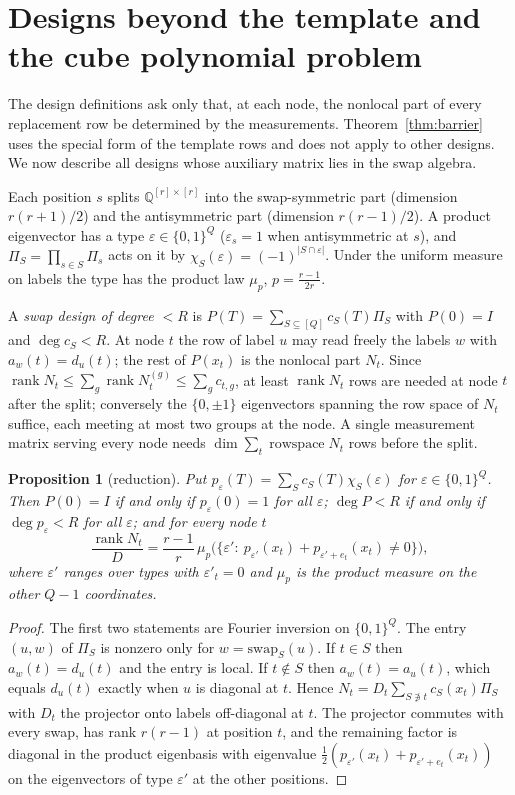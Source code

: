 \documentclass[11pt]{article}
\newtheorem{proposition}[theorem]{Proposition}
\theoremstyle{definition}
\theoremstyle{remark}
\newcommand{\Q}{\mathbb{Q}}
\newcommand{\rank}{\operatorname{rank}}
\begin{document}
\section{Designs beyond the template and the cube polynomial problem}\label{sec:cp}

The design definitions ask only that, at each node, the nonlocal part of every replacement row be determined by the measurements. Theorem~\ref{thm:barrier} uses the special form of the template rows and does not apply to other designs. We now describe all designs whose auxiliary matrix lies in the swap algebra.

Each position $s$ splits $\Q^{[r]\times[r]}$ into the swap-symmetric part (dimension $r(r+1)/2$) and the antisymmetric part (dimension $r(r-1)/2$). A product eigenvector has a type $\varepsilon\in\{0,1\}^Q$ ($\varepsilon_s=1$ when antisymmetric at $s$), and $\Pi_S=\prod_{s\in S}\Pi_s$ acts on it by $\chi_S(\varepsilon)=(-1)^{|S\cap\varepsilon|}$. Under the uniform measure on labels the type has the product law $\mu_p$, $p=\frac{r-1}{2r}$.

A \emph{swap design of degree $<R$} is $P(T)=\sum_{S\subseteq[Q]}c_S(T)\Pi_S$ with $P(0)=I$ and $\deg c_S<R$. At node $t$ the row of label $u$ may read freely the labels $w$ with $a_w(t)=d_u(t)$; the rest of $P(x_t)$ is the nonlocal part $N_t$. Since $\rank N_t\le\sum_g\rank N_t^{(g)}\le\sum_gc_{t,g}$, at least $\rank N_t$ rows are needed at node $t$ after the split; conversely the $\{0,\pm1\}$ eigenvectors spanning the row space of $N_t$ suffice, each meeting at most two groups at the node. A single measurement matrix serving every node needs $\dim\sum_t\operatorname{rowspace}N_t$ rows before the split.

\begin{proposition}[reduction]\label{prop:reduction}
Put $p_\varepsilon(T)=\sum_Sc_S(T)\chi_S(\varepsilon)$ for $\varepsilon\in\{0,1\}^Q$. Then $P(0)=I$ if and only if $p_\varepsilon(0)=1$ for all $\varepsilon$; $\deg P<R$ if and only if $\deg p_\varepsilon<R$ for all $\varepsilon$; and for every node $t$
\[
\frac{\rank N_t}{D}=\frac{r-1}{r}\,\mu_p\big(\{\varepsilon':\ p_{\varepsilon'}(x_t)+p_{\varepsilon'+e_t}(x_t)\ne0\}\big),
\]
where $\varepsilon'$ ranges over types with $\varepsilon'_t=0$ and $\mu_p$ is the product measure on the other $Q-1$ coordinates.
\end{proposition}

\begin{proof}
The first two statements are Fourier inversion on $\{0,1\}^Q$. The entry $(u,w)$ of $\Pi_S$ is nonzero only for $w=\mathrm{swap}_S(u)$. If $t\in S$ then $a_w(t)=d_u(t)$ and the entry is local. If $t\notin S$ then $a_w(t)=a_u(t)$, which equals $d_u(t)$ exactly when $u$ is diagonal at $t$. Hence $N_t=D_t\sum_{S\not\ni t}c_S(x_t)\Pi_S$ with $D_t$ the projector onto labels off-diagonal at $t$. The projector commutes with every swap, has rank $r(r-1)$ at position $t$, and the remaining factor is diagonal in the product eigenbasis with eigenvalue $\frac12(p_{\varepsilon'}(x_t)+p_{\varepsilon'+e_t}(x_t))$ on the eigenvectors of type $\varepsilon'$ at the other positions.
\end{proof}
\end{document}
